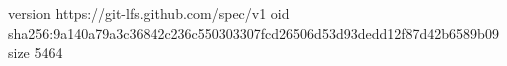 version https://git-lfs.github.com/spec/v1
oid sha256:9a140a79a3c36842c236c550303307fcd26506d53d93dedd12f87d42b6589b09
size 5464
